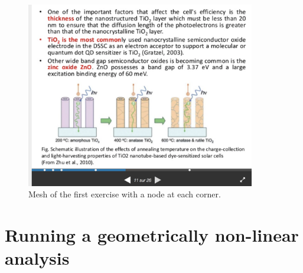 \documentclass[12pt,a4paper]{article}
\begin{document}
\begin{figure}[h!]
\centering
\includegraphics[width=10cm]{a.png}
\caption{Mesh of the first exercise with a node at each corner.}
\end{figure}

\section*{Running a geometrically non-linear analysis}
\end{document}
